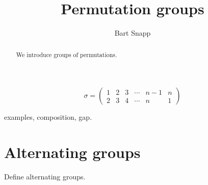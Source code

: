 \documentclass{ximera}
\author{Bart Snapp}
\title{Permutation groups}
\begin{document}
\begin{abstract}
  We introduce groups of permutations. 
\end{abstract}
\maketitle


\[
  \sigma = \left(\begin{smallmatrix}
    1 & 2 & 3 & \cdots & n-1 & n \\
    2 & 3 & 4 & \cdots &  n  & 1
  \end{smallmatrix}\right)
\]


examples, composition, gap.

\section{Alternating groups}

Define alternating groups.
\end{document}
